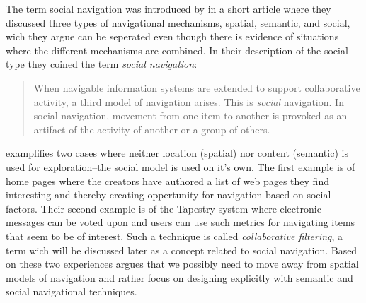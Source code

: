 The term social navigation was introduced by \citet{dourish94} in a short
article where they discussed three types of navigational mechanisms, spatial,
semantic, and social, wich they argue can be seperated even though there is
evidence of situations where the different mechanisms are combined.
In their description of the social type they coined the term
\emph{social navigation}:

\begin{quote}
  When navigable information systems are extended to support collaborative
  activity, a third model of navigation arises. This is \emph{social}
  navigation. In social navigation, movement from one item to another is
  provoked as an artifact of the activity of another or a group of others.
  \citep[p.~1]{dourish94}
\end{quote}

\citeauthor{dourish94} examplifies two cases where neither location
(spatial) nor content (semantic) is used for exploration--the social model
is used on it's own. The first example is of home pages where the creators
have authored a list of web pages they find interesting and thereby creating
oppertunity for navigation based on social factors. Their second example
is of the Tapestry \citep{goldberg92} system where electronic messages can be
voted upon and users can use such metrics for navigating items that seem to be
of interest. Such a technique is called \emph{collaborative filtering},
a term wich will be discussed later as a concept related to social navigation.
Based on these two experiences \citeauthor{dourish94} argues that we possibly
need to move away from spatial models of navigation and rather focus on
designing explicitly with semantic and social navigational techniques.
